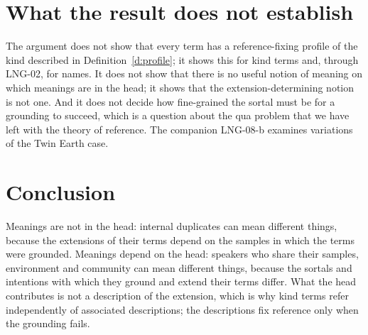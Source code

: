 \documentclass{situationist-preprint}
\begin{document}
\section{What the result does not establish}

The argument does not show that every term has a reference-fixing profile of the kind described in Definition~\ref{d:profile}; it shows this for kind terms and, through LNG-02, for names. It does not show that there is no useful notion of meaning on which meanings are in the head; it shows that the extension-determining notion is not one. And it does not decide how fine-grained the sortal must be for a grounding to succeed, which is a question about the qua problem that we have left with the theory of reference. The companion LNG-08-b examines variations of the Twin Earth case.

\section{Conclusion}

Meanings are not in the head: internal duplicates can mean different things, because the extensions of their terms depend on the samples in which the terms were grounded. Meanings depend on the head: speakers who share their samples, environment and community can mean different things, because the sortals and intentions with which they ground and extend their terms differ. What the head contributes is not a description of the extension, which is why kind terms refer independently of associated descriptions; the descriptions fix reference only when the grounding fails.
\end{document}
